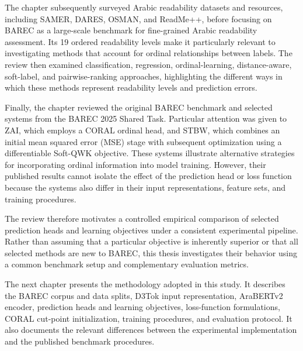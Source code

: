 \documentclass[12pt]{report}
\begin{document}
The chapter subsequently surveyed Arabic readability datasets and resources, including SAMER, DARES, OSMAN, and ReadMe++, before focusing on BAREC as a large-scale benchmark for fine-grained Arabic readability assessment. Its 19 ordered readability levels make it particularly relevant to investigating methods that account for ordinal relationships between labels. The review then examined classification, regression, ordinal-learning, distance-aware, soft-label, and pairwise-ranking approaches, highlighting the different ways in which these methods represent readability levels and prediction errors.

Finally, the chapter reviewed the original BAREC benchmark and selected systems from the BAREC 2025 Shared Task. Particular attention was given to ZAI, which employs a CORAL ordinal head, and STBW, which combines an initial mean squared error (MSE) stage with subsequent optimization using a differentiable Soft-QWK objective. These systems illustrate alternative strategies for incorporating ordinal information into model training. However, their published results cannot isolate the effect of the prediction head or loss function because the systems also differ in their input representations, feature sets, and training procedures.

The review therefore motivates a controlled empirical comparison of selected prediction heads and learning objectives under a consistent experimental pipeline. Rather than assuming that a particular objective is inherently superior or that all selected methods are new to BAREC, this thesis investigates their behavior using a common benchmark setup and complementary evaluation metrics.

The next chapter presents the methodology adopted in this study. It describes the BAREC corpus and data splits, D3Tok input representation, AraBERTv2 encoder, prediction heads and learning objectives, loss-function formulations, CORAL cut-point initialization, training procedures, and evaluation protocol. It also documents the relevant differences between the experimental implementation and the published benchmark procedures.






\end{document}
